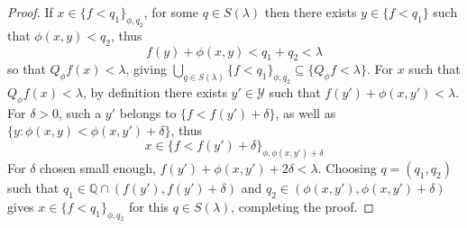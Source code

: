 \documentclass[11pt]{article}
\newcommand{\1}{[1]}
\begin{document}
\begin{proof}
    If $x \in \{ f < q_1 \}_{\phi,q_2}$, for some $q \in S(\lambda)$ then there exists $y \in \{ f < q_1\}$ such that $\phi(x,y)< q_2$, thus
    \[
        f(y) + \phi(x,y) < q_1 + q_2 < \lambda
    \]
    so that $Q_\phi f(x) < \lambda$, giving $\bigcup_{q \in S(\lambda)} \{ f < q_1 \}_{\phi,q_2} \subseteq \{ Q_\phi f < \lambda \}$.
    For $x$ such that $Q_\phi f(x) < \lambda$, by definition there exists $y' \in \mathcal{Y}$ such that $f(y') + \phi(x,y') < \lambda$.  For $\delta > 0$, such a $y'$ belongs to $\{ f < f(y') + \delta \}$, as well as $\{ y : \phi(x,y) < \phi(x,y') + \delta \}$, thus
    \[
        x \in \{ f < f(y') + \delta \}_{\phi,\phi(x,y') + \delta} 
    \] 
    For $\delta$ chosen small enough, $f(y') + \phi(x,y') + 2 \delta < \lambda$.  Choosing $q = (q_1,q_2)$ such that $q_1 \in \mathbb{Q} \cap (f(y'), f(y') + \delta)$ and $q_2 \in (\phi(x,y'), \phi(x,y') + \delta)$ gives $x \in \{ f < q_1 \}_{\phi,q_2}$ for this $q \in S(\lambda)$, completing the proof.
\end{proof}
\end{document}
